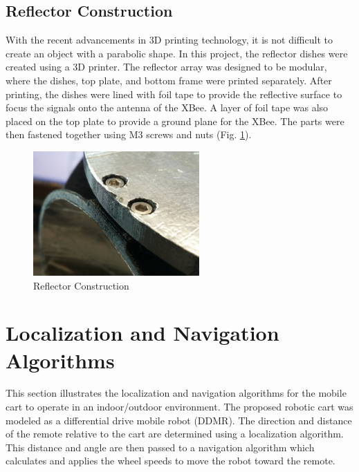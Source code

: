 \subsection{Reflector Construction}
With the recent advancements in 3D printing technology, it is not difficult to
create an object with a parabolic shape. In this project, the reflector dishes
were created using a 3D printer. The reflector array was designed to be modular,
where the dishes, top plate, and bottom frame were printed separately. After
printing, the dishes were lined with foil tape to provide the reflective surface
to focus the signals onto the antenna of the XBee. A layer of foil tape was also
placed on the top plate to provide a ground plane for the XBee. The parts were
then fastened together using M3 screws and nuts (Fig.
\ref{fig:reflectorConstruction}).
%
\begin{figure}[H]
    \centering
    \includegraphics[width=2.5in]{figs/img/reflectorConstruction.jpg}
    \caption{Reflector Construction}
    \label{fig:reflectorConstruction}
\end{figure}

\section{Localization and Navigation Algorithms}\label{sec:locAndNavAlgos}

This section illustrates the localization and navigation algorithms for the mobile cart to operate in an indoor/outdoor environment. The proposed robotic cart was modeled as a differential drive mobile robot (DDMR). The direction and distance of the remote relative to the cart are determined using a localization algorithm. This distance and angle are then passed to a navigation algorithm which calculates and applies the wheel speeds to move the robot toward the remote.

